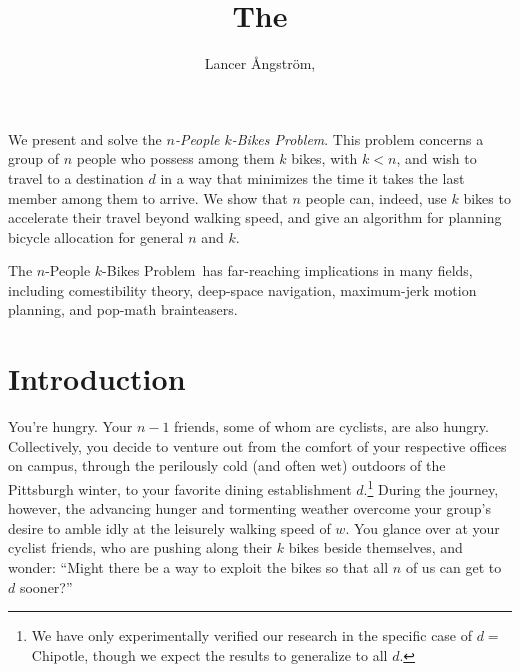 \documentclass[DIV=calc, paper=a4, fontsize=11pt, twocolumn]{scrartcl}	 %
\title{The \Prob} %
\author{Lancer \r{A}ngstr\"{o}m, } %
\date{} %
\newcommand{\initial}[1]{ %
\lettrine[lines=3,lhang=0.3,nindent=0em]{
\color{DarkGoldenrod}
{\textsf{#1}}}{}}
\newcommand\prob{$n$-People $k$-Bikes Problem}
\begin{document}
\maketitle %




\initial{W}e present and solve the {\em \prob}. This problem concerns a group of $n$ people who possess among them $k$ bikes, with $k<n$, and wish to travel to a destination $d$ in a way that minimizes the time it takes the last member among them to arrive. We show that $n$ people can, indeed, use $k$ bikes to accelerate their travel beyond walking speed, and give an algorithm for planning bicycle allocation for general $n$ and $k$.

The \prob~has far-reaching implications in many fields, including comestibility theory, deep-space navigation, maximum-jerk motion planning, and pop-math brainteasers.


\section{Introduction}

\initial{Y}ou're hungry. Your $n-1$ friends, some of whom are cyclists, are also hungry. Collectively, you decide to venture out from the comfort of your respective offices on campus, through the perilously cold (and often wet) outdoors of the Pittsburgh winter, to your favorite dining establishment $d$.\footnote{
We have only experimentally verified our research in the specific case of $d =$ {\sf Chipotle}, though we expect the results to generalize to all $d$.}
During the journey, however, the advancing hunger and tormenting weather overcome your group's desire to amble idly at the leisurely walking speed of $w$.
You glance over at your cyclist friends, who are pushing along their $k$ bikes beside themselves, and wonder: ``Might there be a way to exploit the bikes so that all $n$ of us can get to $d$ sooner?''
\end{document}
